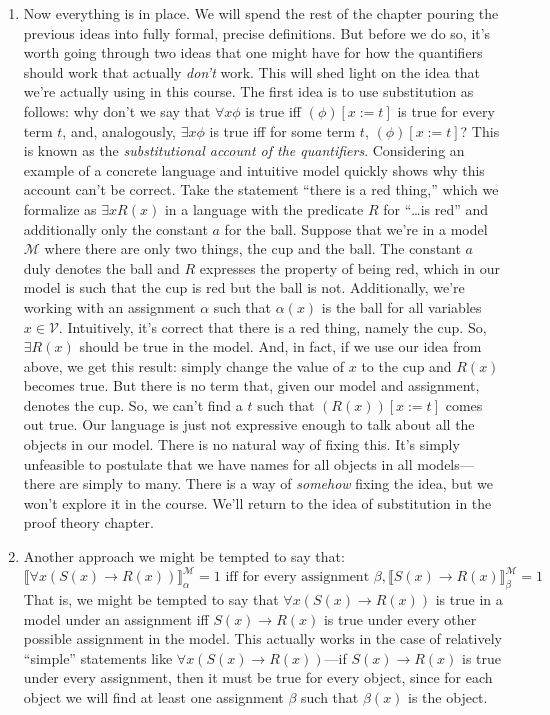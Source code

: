 \begin{enumerate}[\thesection.1]
	\item Now everything is in place. We will spend the rest of the chapter pouring the previous ideas into fully formal, precise definitions. But before we do so, it's worth going through two ideas that one might have for how the quantifiers should work that actually \emph{don't} work. This will shed light on the idea that we're actually using in this course. The first idea is to use substitution as follows: why don't we say that $\forall x\phi$ is true iff $(\phi)[x:=t]$ is true for every term $t$, and, analogously, $\exists x\phi$ is true iff for some term $t$, $(\phi)[x:=t]$? This is known as the \emph{substitutional account of the quantifiers}. Considering an example of a concrete language and intuitive model quickly shows why this account can't be correct. Take the statement ``there is a red thing,'' which we formalize as $\exists xR(x)$ in a language with the predicate $R$ for ``\dots is red'' and additionally only the constant $a$ for the ball. Suppose that we're in a model $\mathcal{M}$ where there are only two things, the cup and the ball. The constant $a$ duly denotes the ball and $R$ expresses the property of being red, which in our model is such that the cup is red but the ball is not. Additionally, we're working with an assignment $\alpha$ such that $\alpha(x)$ is the ball for all variables $x\in\mathcal{V}$. Intuitively, it's correct that there is a red thing, namely the cup. So, $\exists R(x)$ should be true in the model. And, in fact, if we use our idea from above, we get this result: simply change the value of $x$ to the cup and $R(x)$ becomes true. But there is no term that, given our model and assignment, denotes the cup. So, we can't find a $t$ such that  $(R(x))[x:=t]$ comes out true. Our language is just not expressive enough to talk about all the objects in our model. There is no natural way of fixing this. It's simply unfeasible to postulate that we have names for all objects in all models---there are simply to many. There is a way of \emph{somehow} fixing the idea, but we won't explore it in the course. We'll return to the idea of substitution in the proof theory chapter.
		
	\item Another approach we might be tempted to say that: \[\llbracket \forall x(S(x)\to R(x))\rrbracket^\mathcal{M}_\alpha=1\text{ iff for every assignment }\beta, \llbracket S(x)\to R(x)\rrbracket^\mathcal{M}_\beta=1\] That is, we might be tempted to say that $\forall x(S(x)\to R(x))$ is true in a model under an assignment iff $S(x)\to R(x)$ is true under every other possible assignment in the model. This actually works in the case of relatively ``simple'' statements like $\forall x(S(x)\to R(x))$---if $S(x)\to R(x)$ is true under every assignment, then it must be true for every object, since for each object we will find at least one assignment $\beta$ such that $\beta(x)$ is the object. 
	

\end{enumerate}
